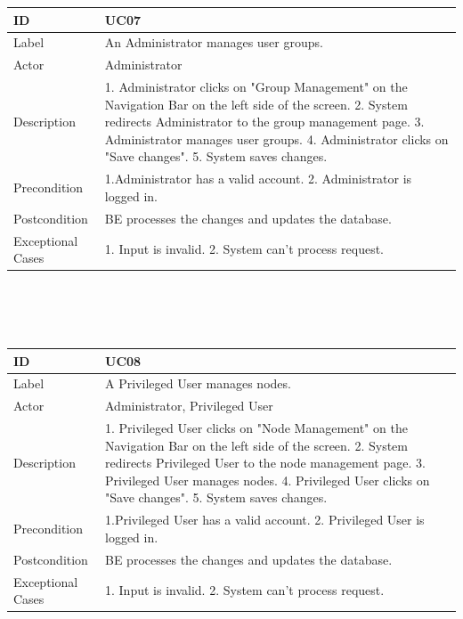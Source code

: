 \documentclass{scrreprt}
\begin{document}
\begin{tabularx}{12cm}{l|X}
ID & UC07  \\
\hline
Label & 
An Administrator manages user groups. \\
\hline
Actor            & Administrator    \\
\hline
Description            &  	1. Administrator clicks on "Group Management" on the Navigation Bar on the left side of the screen. 2. System redirects Administrator to the group management page. 3. Administrator manages user groups. 4. Administrator clicks on "Save changes". 5. System saves changes.  
\\
\hline
Precondition           & 1.Administrator has a valid account. 2. Administrator is logged in.  \\
\hline
Postcondition     & BE processes the changes and updates the database.\\
\hline
Exceptional Cases & 1. Input is invalid. 2. System can't process request.
\end{tabularx}
\\
\\ \\
\begin{tabularx}{12cm}{l|X}
ID & UC08  \\
\hline
Label & 
A Privileged User manages nodes. \\
\hline
Actor            & Administrator, Privileged User    \\
\hline
Description            &  	1. Privileged User clicks on "Node Management" on the Navigation Bar on the left side of the screen. 2. System redirects Privileged User to the node management page. 3. Privileged User manages nodes. 4. Privileged User clicks on "Save changes". 5. System saves changes.  
\\
\hline
Precondition           & 1.Privileged User has a valid account. 2. Privileged User is logged in.  \\
\hline
Postcondition     &  BE processes the changes and updates the database.\\
\hline
Exceptional Cases & 1. Input is invalid. 2. System can't process request.
\end{tabularx}
\\
\\ \\
\end{document}
